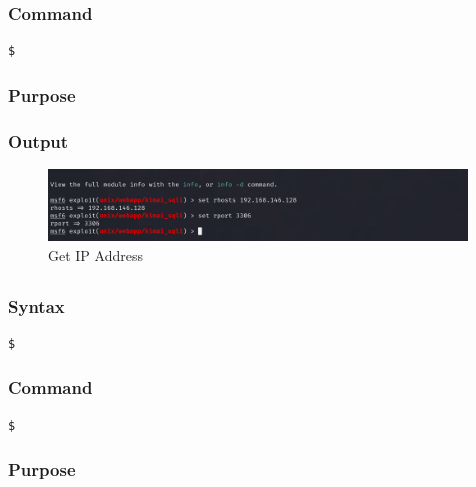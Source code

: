 \documentclass[11pt]{article}
\begin{document}
\subsubsection*{Command}
\begin{verbatim}
$
\end{verbatim}

\subsubsection*{Purpose}

\subsubsection*{Output}
\begin{figure}[H]
    \centering
    \includegraphics[width=0.99\textwidth]{a3_ss (25).png}
    \caption{Get IP Address}
    \label{fig:1}
\end{figure}
\subsection{}

\subsubsection*{Syntax}
\begin{verbatim}
$
\end{verbatim}

\subsubsection*{Command}
\begin{verbatim}
$
\end{verbatim}

\subsubsection*{Purpose}
\end{document}
